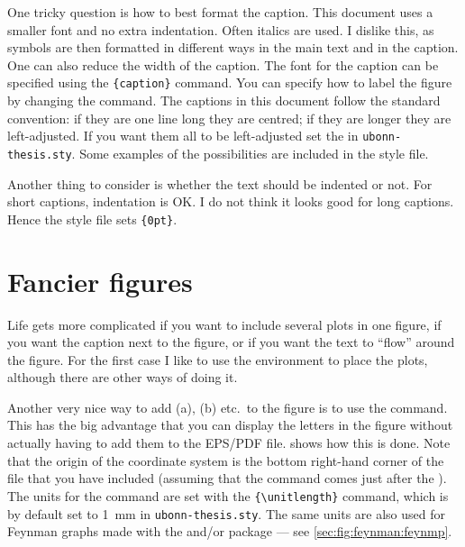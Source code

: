 One tricky question is how to best format the caption. This document
uses a smaller font and no extra indentation. Often italics are
used. I dislike this, as symbols are then formatted in different ways
in the main text and in the caption. One can also reduce the width of
the caption. The font for the caption can be specified using the
\texttt{\{caption\}} command. You can specify how
to label the figure by changing the  command. The
captions in this document follow the standard \KOMAScript{}
convention: if they are one line long they are centred; if they are
longer they are left-adjusted. If you want them all to be
left-adjusted set the  
in \texttt{ubonn-thesis.sty}. Some examples of the possibilities are
included in the style file.

Another thing to consider is whether the text should be indented or
not. For short captions, indentation is OK\@. I do not think it looks
good for long captions. Hence the style file sets
\texttt{\{0pt\}}.

\section{Fancier figures}%
\label{sec:fig:fancy}

Life gets more complicated if you want to include several plots in
one figure, if you want the caption next to the figure, or if you want
the text to \enquote{flow} around the figure. For the first case I like to
use the  environment to place the plots, although
there are other ways of doing it.

Another very nice way to add (a), (b) etc.\ to the figure is to use the
 command. This has the big advantage that you can display
the letters in the figure without actually having to add them to the
EPS/PDF file.  shows how this is done. Note
that the origin of the coordinate system is the bottom right-hand
corner of the file that you have included (assuming that the
 command comes just after the ).
The units for the  command are set with the
\texttt{\{\textbackslash unitlength\}} command, which
is by default set to \SI{1}{\mm} in \texttt{ubonn-thesis.sty}.
The same units are also used for Feynman graphs made with the
 and/or  package --- see
\cref{sec:fig:feynman:feynmp}.

